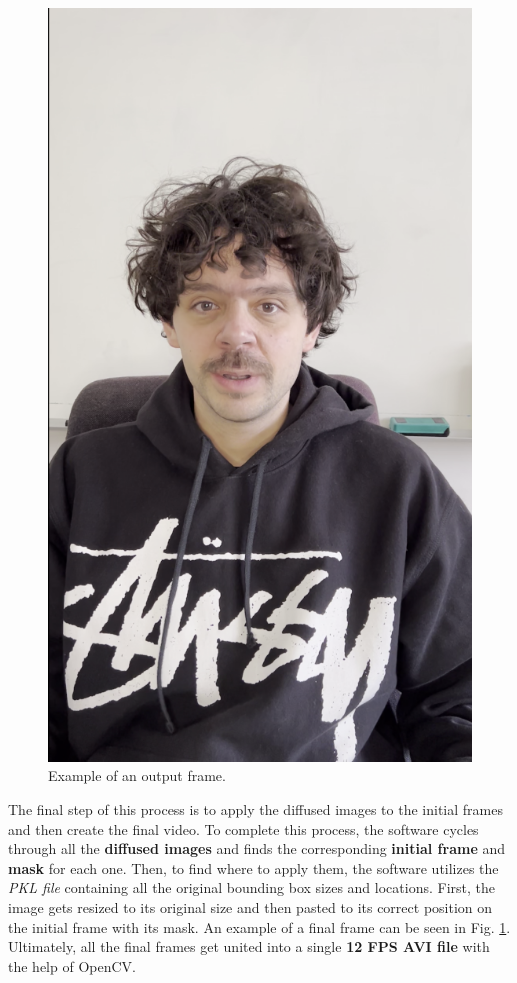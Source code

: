 \documentclass[preprint]{elsarticle}
\begin{document}
\begin{figure}[H]
	\centering
	\includegraphics[scale=0.2, keepaspectratio]{img/project_img/output.png}
	\caption{Example of an output frame.}
	\label{fig:output}
\end{figure}
The final step of this process is to apply the diffused images to the initial frames 
and then create the final video. 
To complete this process, the software cycles through all the \textbf{diffused images} 
and finds the corresponding \textbf{initial frame} and \textbf{mask} for each one. 
Then, to find where to apply them, the software utilizes the \emph{PKL file} 
containing all the original bounding box sizes and locations. 
First, the image gets resized to its original size and then pasted 
to its correct position on the initial frame with its mask. 
An example of a final frame can be seen in Fig. \ref{fig:output}.
Ultimately, all the final frames get united into a single \textbf{12 FPS AVI file} with the help of OpenCV.
\end{document}
